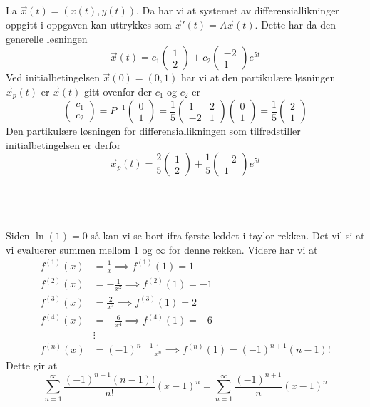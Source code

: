 \documentclass[12pt, a4paper,norsk]{article}
\newcommand{\oppgave}{\,\section{}}
\newcommand{\deloppgave}{\subsection{}}
\newcommand{\inverse}{^{-1}}
\begin{document}
	\deloppgave
	La $\vec{x}(t) = (x(t), y(t))$. Da har vi at systemet av differensiallikninger oppgitt i oppgaven kan uttrykkes som $\vec{x}'(t) = A\vec{x}(t)$. Dette har da den generelle løsningen
	$$
	\vec{x}(t) = c_1\begin{pmatrix}
		1\\2
	\end{pmatrix} + c_2\begin{pmatrix}
	-2\\1
	\end{pmatrix}e^{5t}
	$$
	Ved initialbetingelsen $\vec{x}(0) = (0, 1)$ har vi at den partikulære løsningen $\vec{x}_p(t)$ er $\vec{x}(t)$ gitt ovenfor der $c_1$ og $c_2$ er
	$$
	\begin{pmatrix}
		c_1\\c_2
	\end{pmatrix}
	= P\inverse \begin{pmatrix}
		0\\1
	\end{pmatrix} = \frac{1}{5}\begin{pmatrix}
	1 & 2\\
	-2 & 1
	\end{pmatrix}\begin{pmatrix}
	0\\1
	\end{pmatrix} = \frac{1}{5}\begin{pmatrix}
	2\\1
	\end{pmatrix}
	$$
	Den partikulære løsningen for differensiallikningen som tilfredstiller initialbetingelsen er derfor
	$$
	\vec{x}_p(t) = \frac{2}{5}\begin{pmatrix}
		1\\2
	\end{pmatrix} + \frac{1}{5}\begin{pmatrix}
		-2\\1
	\end{pmatrix}e^{5t}
	$$
	
	\oppgave
	\deloppgave
	Siden $\ln(1) = 0$ så kan vi se bort ifra første leddet i taylor-rekken. Det vil si at vi evaluerer summen mellom $1$ og $\infty$ for denne rekken. Videre har vi at
	\begin{align*}
		f^{(1)}(x) &= \frac{1}{x} \implies f^{(1)}(1) = 1\\
		f^{(2)}(x) &= -\frac{1}{x^2} \implies f^{(2)}(1) = -1\\
		f^{(3)}(x) &= \frac{2}{x^3} \implies f^{(3)}(1) = 2\\
		f^{(4)}(x) &= -\frac{6}{x^4} \implies f^{(4)}(1) = -6\\
		&\vdots\\
		f^{(n)}(x) &= \left(-1\right)^{n+1}\frac{1}{x^{n}} \implies f^{(n)}(1) = \left(-1\right)^{n+1}(n-1)!
	\end{align*}
	Dette gir at
	$$
	\sum_{n = 1}^\infty \frac{\left(-1\right)^{n+1}(n-1)!}{n!}(x-1)^n = \sum_{n = 1}^\infty \frac{\left(-1\right)^{n+1}}{n}(x-1)^n
	$$
	
\end{document}
